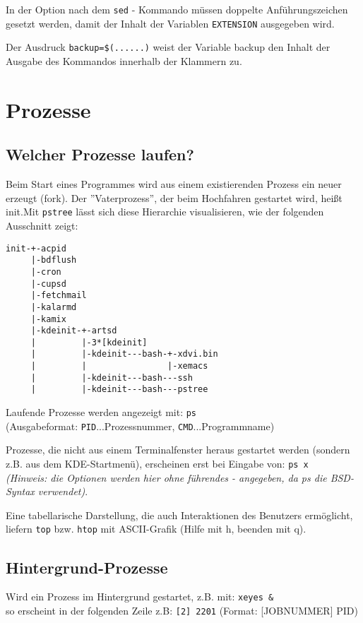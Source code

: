 \documentclass[11pt]{article}
\begin{document}
In der Option nach dem \texttt{sed} - Kommando müssen doppelte Anführungszeichen gesetzt werden, damit der Inhalt der Variablen \texttt{EXTENSION} ausgegeben wird.

Der Ausdruck \texttt{backup=\$(......)} weist der Variable backup den Inhalt der Ausgabe des Kommandos innerhalb der Klammern zu.



\section{Prozesse}
\subsection{Welcher Prozesse laufen?}
Beim Start eines Programmes wird aus einem existierenden Prozess ein
neuer erzeugt (fork). Der ''Vaterprozess'', der beim Hochfahren
gestartet wird, heißt init.Mit \texttt{pstree} lässt sich diese
Hierarchie visualisieren, wie der folgenden Ausschnitt zeigt:
\begin{samepage}
\begin{verbatim}
init-+-acpid
     |-bdflush
     |-cron
     |-cupsd
     |-fetchmail
     |-kalarmd
     |-kamix
     |-kdeinit-+-artsd
     |         |-3*[kdeinit]
     |         |-kdeinit---bash-+-xdvi.bin
     |         |                |-xemacs
     |         |-kdeinit---bash---ssh
     |         |-kdeinit---bash---pstree
\end{verbatim}
\end{samepage}

Laufende Prozesse werden angezeigt mit: 
\texttt{ps}\\
(Ausgabeformat: \texttt{PID}...Prozessnummer, \texttt{CMD}...Programmname)

Prozesse, die nicht aus einem Terminalfenster heraus gestartet werden
(sondern z.B. aus dem KDE-Startmenü), erscheinen erst bei Eingabe von:
\texttt{ps x}\\
\textit{(Hinweis: die Optionen werden hier ohne führendes - angegeben,
  da ps die BSD-Syntax verwendet)}.

Eine tabellarische Darstellung, die auch Interaktionen des Benutzers
ermöglicht, liefern 
\texttt{top} bzw. \texttt{htop} mit ASCII-Grafik
(Hilfe mit h, beenden mit q).


\subsection{Hintergrund-Prozesse}
Wird ein Prozess im Hintergrund gestartet, z.B. mit:
\texttt{xeyes \&} \\
so erscheint in der folgenden Zeile z.B: 
\texttt{[2] 2201} (Format: [JOBNUMMER] PID)
\end{document}
